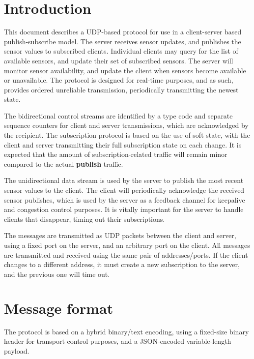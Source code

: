 \documentclass[a4paper]{article}
\begin{document}


\tableofcontents
\newpage

\section{Introduction}
This document describes a UDP-based protocol for use in a client-server based publish-subscribe model.
The server receives sensor updates, and publishes the sensor values to subscribed clients.
Individual clients may query for the list of available sensors, and update their set of subscribed sensors.
The server will monitor sensor availability, and update the client when sensors become available or unavailable.
The protocol is designed for real-time purposes, and as such, provides ordered unreliable transmission, periodically transmitting the newest state.

The bidirectional control streams are identified by a type code and separate sequence counters for client and server transmissions, which are acknowledged by the recipient.
The subscription protocol is based on the use of soft state, with the client and server transmitting their full subscription state on each change.
It is expected that the amount of subscription-related traffic will remain minor compared to the actual \textbf{publish}-traffic.

The unidirectional data stream is used by the server to publish the most recent sensor values to the client.
The client will periodically acknowledge the received sensor publishes, which is used by the server as a feedback channel for keepalive and congestion control purposes.
It is vitally important for the server to handle clients that disappear, timing out their subscriptions.

The messages are transmitted as UDP packets between the client and server, using a fixed port on the server, and an arbitrary port on the client.
All messages are transmitted and received using the same pair of addresses/ports.
If the client changes to a different address, it must create a new subscription to the server, and the previous one will time out.

\section{Message format}
The protocol is based on a hybrid binary/text encoding, using a fixed-size binary header for transport control purposes, and a JSON-encoded variable-length payload.
\end{document}
